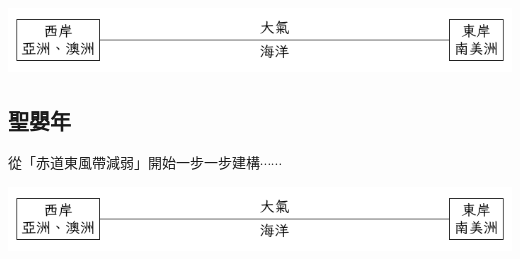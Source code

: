 \documentclass[12pt]{article}
\begin{document}
\begin{center} \includegraphics*[width=15cm]{c.pdf} \end{center}

\vspace{4cm}

\subsection{聖嬰年}

從「赤道東風帶減弱」開始一步一步建構$\cdots\cdots$

\vspace{4cm}

\begin{center} \includegraphics*[width=15cm]{c.pdf} \end{center}

\vspace{4cm}
\end{document}
